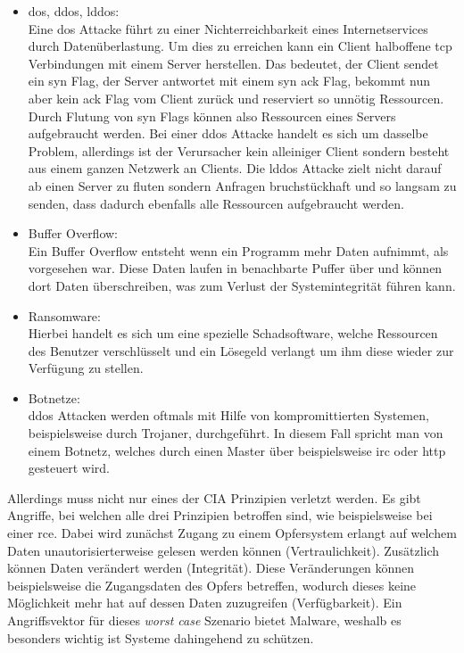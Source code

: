 \documentclass[
    12pt, %
    DIV10,
    ngerman, %
    a4paper, %
    oneside, %
    titlepage, %
    parskip=half, %
    headings=normal, %
    listof=totoc, %
    bibliography=totoc, %
    index=totoc, %
    captions=tableheading, %
    final %
]{scrreprt}
\begin{document}
\begin{itemize}
\begin{itemize}
\item \ac{dos}, \ac{ddos}, \ac{lddos}:\\Eine \ac{dos} Attacke führt zu einer Nichterreichbarkeit eines Internetservices durch Datenüberlastung. Um dies zu erreichen kann ein Client halboffene \ac{tcp} Verbindungen mit einem Server herstellen. Das bedeutet, der Client sendet ein \ac{syn} Flag, der Server antwortet mit einem \ac{syn} \ac{ack} Flag, bekommt nun aber kein \ac{ack} Flag vom Client zurück und reserviert so unnötig Ressourcen. Durch Flutung von \ac{syn} Flags können also Ressourcen eines Servers aufgebraucht werden. Bei einer \ac{ddos} Attacke handelt es sich um dasselbe Problem, allerdings ist der Verursacher kein alleiniger Client sondern besteht aus einem ganzen Netzwerk an Clients. Die \ac{lddos} Attacke zielt nicht darauf ab einen Server zu fluten sondern Anfragen bruchstückhaft und so langsam zu senden, dass dadurch ebenfalls alle Ressourcen aufgebraucht werden.
\item Buffer Overflow:\\Ein Buffer Overflow entsteht wenn ein Programm mehr Daten aufnimmt, als vorgesehen war. Diese Daten laufen in benachbarte Puffer über und können dort Daten überschreiben, was zum Verlust der Systemintegrität führen kann. 
\item Ransomware:\\Hierbei handelt es sich um eine spezielle Schadsoftware, welche Ressourcen des Benutzer verschlüsselt und ein Lösegeld verlangt um ihm diese wieder zur Verfügung zu stellen.
\item Botnetze:\\\ac{ddos} Attacken werden oftmals mit Hilfe von kompromittierten Systemen, beispielsweise durch Trojaner, durchgeführt. In diesem Fall spricht man von einem Botnetz, welches durch einen Master über beispielsweise \ac{irc} oder \ac{http} gesteuert wird.
\end{itemize}
\end{itemize}
Allerdings muss nicht nur eines der CIA Prinzipien verletzt werden. Es gibt Angriffe, bei welchen alle drei Prinzipien betroffen sind, wie beispielsweise bei einer \ac{rce}. Dabei wird zunächst Zugang zu einem Opfersystem erlangt auf welchem Daten unautorisierterweise gelesen werden können (Vertraulichkeit). Zusätzlich können Daten verändert werden (Integrität). Diese Veränderungen können beispielsweise die Zugangsdaten des Opfers betreffen, wodurch dieses keine Möglichkeit mehr hat auf dessen Daten zuzugreifen (Verfügbarkeit). Ein Angriffsvektor für dieses \emph{worst case} Szenario bietet Malware, weshalb es besonders wichtig ist Systeme dahingehend zu schützen.
\end{document}
